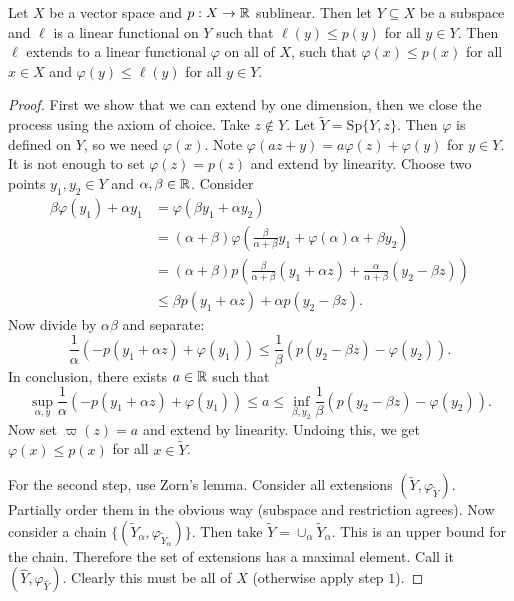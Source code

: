 \documentclass[10pt, twoside]{article}
\begin{document}
    \begin{thm}
        Let $X$ be a vector space and $p: X \to \mathbb{R}$ sublinear. Then let $Y \subseteq X$ be a subspace and $\ell$ is a linear functional on $Y$ such that $\ell(y) \leq p(y)$ for all $y \in Y$. Then $\ell$ extends to a linear functional $\varphi$ on all of $X$, such that $\varphi(x) \leq p(x)$ for all $x \in X$ and $\varphi(y) \leq \ell(y)$ for all $y \in Y$.
        \begin{proof}
            First we show that we can extend by one dimension, then we close the process using the axiom of choice. Take $z \notin Y$. Let $\widetilde{Y} = \mathrm{Sp}\{Y,z\}$. Then $\varphi$ is defined on $Y$, so we need $\varphi(x)$. Note $\varphi(az + y) = a \varphi(z) + \varphi(y)$ for $y \in Y$. It is not enough to set $\varphi(z) = p(z)$ and extend by linearity. Choose two points $y_1, y_2 \in Y$ and $\alpha,\beta \in \mathbb{R}$. Consider
        \begin{align*}
            \beta \varphi(y_1) + \alpha y_1 &= \varphi(\beta y_1 + \alpha y_2) \\ 
                                            &= (\alpha + \beta)\varphi \left( \frac{\beta}{\alpha + \beta} y_1 + \varphi(\alpha){\alpha + \beta} y_2 \right) \\
                                            &= (\alpha + \beta) p \left( \frac{\beta}{\alpha + \beta} (y_1 + \alpha z) + \frac{\alpha}{\alpha + \beta} (y_2 - \beta z) \right) \\
                                            &\leq \beta p(y_1 + \alpha z) + \alpha p(y_2 - \beta z).
        \end{align*}
        Now divide by $\alpha \beta$ and separate: \[ \frac{1}{\alpha} (-p(y_1 + \alpha z) + \varphi(y_1)) \leq \frac{1}{\beta} (p(y_2 - \beta z) - \varphi(y_2)). \] In conclusion, there exists $a \in \mathbb{R}$ such that \[ \sup_{\alpha,y} \frac{1}{\alpha} (-p(y_1 + \alpha z) + \varphi(y_1)) \leq a \leq \inf_{\beta, y_2} \frac{1}{\beta} (p(y_2 - \beta z) - \varphi(y_2)). \] Now set $\varpi(z) = a$ and extend by linearity. Undoing this, we get $\varphi(x) \leq p(x)$ for all $x \in \widetilde{Y}$.

        For the second step, use Zorn's lemma. Consider all extensions $( \widetilde{Y}, \varphi_{\widetilde{Y}} )$. Partially order them in the obvious way (subspace and restriction agrees). Now consider a chain $\{(\widetilde{Y}_{\alpha}, \varphi_{\widetilde{Y}_\alpha})\}$. Then take $\widetilde{Y} = \cup_{\alpha} \tilde{Y}_{\alpha}$. This is an upper bound for the chain. Therefore the set of extensions has a maximal element. Call it $( \hat{Y}, \varphi_{\hat{Y}} )$. Clearly this must be all of $X$ (otherwise apply step $1$).
        \end{proof}
    \end{thm}
\end{document}
